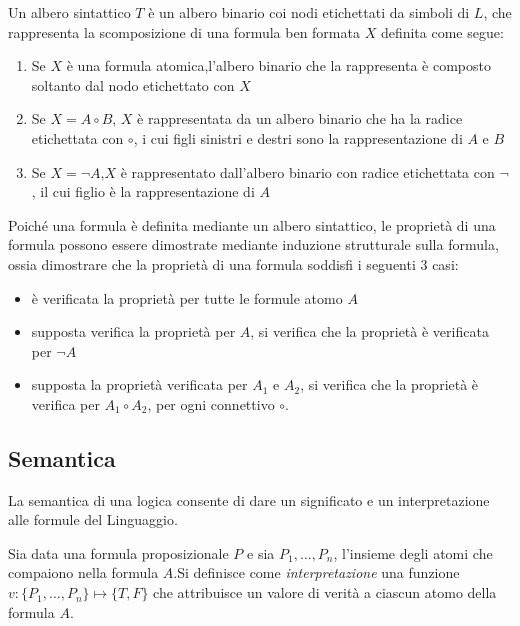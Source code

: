 \documentclass[a4paper,12pt, oneside]{book}
\begin{document}
\begin{definizione}
  Un albero sintattico $T$ è un albero binario coi nodi etichettati da simboli
  di $L$, che rappresenta la scomposizione di una formula ben formata $X$
  definita 
  come segue: 
\end{definizione}
\begin{enumerate}
  \item Se $X$ è una formula atomica,l'albero binario che la rappresenta è
  composto 
  soltanto dal nodo etichettato con $X$
  \item Se $X = A \circ B$, $X$ è rappresentata da un albero binario che ha la
  radice 
  etichettata con $\circ$, i cui figli sinistri e destri sono la
  rappresentazione di $A$ e $B$ 
  \item Se $X = \neg A$,$X$ è rappresentato dall'albero binario con radice
  etichettata 
  con $\neg$, il cui figlio è la rappresentazione di $A$
\end{enumerate}

Poiché una formula è definita mediante un albero sintattico, le proprietà di una
formula 
possono essere dimostrate mediante induzione strutturale sulla formula, ossia
dimostrare 
che la proprietà di una formula soddisfi i seguenti 3 casi:
\begin{itemize}
  \item è verificata la proprietà per tutte le formule atomo $A$
  \item supposta verifica la proprietà per $A$, si verifica che la proprietà è
  verificata per $\neg A$ 
  \item supposta la proprietà verificata per $A_1$ e $A_2$, si verifica che la
  proprietà è verifica per $A_1 \circ A_2$, per ogni connettivo $\circ$.
\end{itemize}
\newpage
\subsection{Semantica}
La semantica di una logica consente di dare un significato e un interpretazione
alle formule del Linguaggio.\newline

\begin{definizione}
  Sia data una formula proposizionale $P$ e sia ${P_1,\dots,P_n}$, l'insieme
  degli 
  atomi che compaiono nella formula $A$.Si definisce come \emph{interpretazione}
  una 
  funzione $v:\{P_1,\dots,P_n\} \mapsto \{T,F\}$ che attribuisce un valore di
  verità 
  a ciascun atomo della formula $A$.
\end{definizione}
\end{document}
